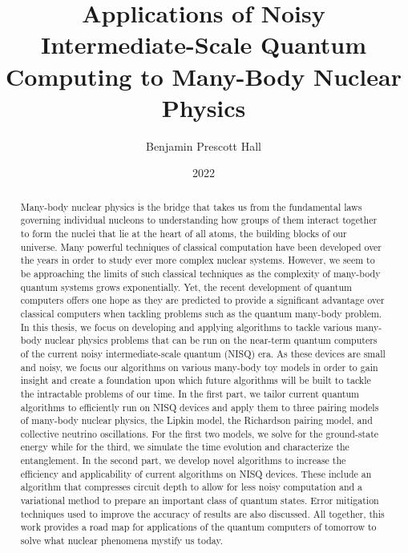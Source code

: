 \documentclass[Dual]{msu-thesis}
\title{Applications of Noisy Intermediate-Scale Quantum Computing to Many-Body Nuclear Physics}
\author{Benjamin Prescott Hall}
\date{2022}
\begin{document}
\frontmatter

\maketitlepage

\begin{abstract}

\quad Many-body nuclear physics is the bridge that takes us from the fundamental laws governing individual nucleons to understanding how groups of them interact together to form the nuclei that lie at the heart of all atoms, the building blocks of our universe. Many powerful techniques of classical computation have been developed over the years in order to study ever more complex nuclear systems. However, we seem to be approaching the limits of such classical techniques as the complexity of many-body quantum systems grows exponentially. Yet, the recent development of quantum computers offers one hope as they are predicted to provide a significant advantage over classical computers when tackling problems such as the quantum many-body problem. In this thesis, we focus on developing and applying algorithms to tackle various many-body nuclear physics problems that can be run on the near-term quantum computers of the current noisy intermediate-scale quantum (NISQ) era. As these devices are small and noisy, we focus our algorithms on various many-body toy models in order to gain insight and create a foundation upon which future algorithms will be built to tackle the intractable problems of our time. In the first part, we tailor current quantum algorithms to efficiently run on NISQ devices and apply them to three pairing models of many-body nuclear physics, the Lipkin model, the Richardson pairing model, and collective neutrino oscillations. For the first two models, we solve for the ground-state energy while for the third, we simulate the time evolution and characterize the entanglement. In the second part, we develop novel algorithms to increase the efficiency and applicability of current algorithms on NISQ devices. These include an algorithm that compresses circuit depth to allow for less noisy computation and a variational method to prepare an important class of quantum states. Error mitigation techniques used to improve the accuracy of results are also discussed. All together, this work provides a road map for applications of the quantum computers of tomorrow to solve what nuclear phenomena mystify us today.
\end{abstract}

\clearpage

\end{document}
